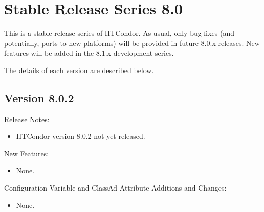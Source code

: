 
\section{\label{sec:History-8-0}Stable Release Series 8.0}

This is a stable release series of HTCondor.
As usual, only bug fixes (and potentially, ports to new platforms)
will be provided in future 8.0.x releases.
New features will be added in the 8.1.x development series.

The details of each version are described below.

\subsection*{\label{sec:New-8-0-2}Version 8.0.2}

\noindent Release Notes:

\begin{itemize}

\item HTCondor version 8.0.2 not yet released.

\end{itemize}


\noindent New Features:

\begin{itemize}

\item None.

\end{itemize}

\noindent Configuration Variable and ClassAd Attribute Additions and Changes:

\begin{itemize}

\item None.

\end{itemize}

